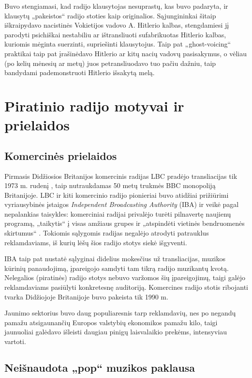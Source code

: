 \documentclass[kursinis-darbas]{vukf}
\begin{document}
Buvo stengiamasi, kad radijo klausytojas nesuprastų, kas buvo padaryta, ir klausytų „pakeistos“ radijo stoties kaip originalios. Sąjungininkai šitaip iškraipydavo nacistinės Vokietijos vadovo A. Hitlerio kalbas, stengdamiesi jį parodyti psichiškai nestabiliu ar ištransliuoti sufabrikuotas Hitlerio kalbas, kuriomis mėginta suerzinti, supriešinti klausytojus. Taip pat „ghost-voicing“ praktikai taip pat įrašinėdavo Hitlerio ar kitų nacių vadovų pasisakymus, o vėliau (po kelių mėnesių ar metų) juos petransliuodavo tuo pačiu dažniu, taip bandydami pademonstruoti Hitlerio išsakytą melą.


\section{Piratinio radijo motyvai ir prielaidos}

\subsection{Komercinės prielaidos}

Pirmasis Didžiosios Britanijos komercinis radijas LBC pradėjo transliacijas tik 1973 m. rudenį \cite{bbc_first_commercial_radio}, taip nutraukdamas 50 metų trukmės \gls{BBC} monopoliją Britanijoje. LBC ir kiti komercinio radijo pionieriai buvo atidžiai prižiūrimi vyriausybinės įstaigos \emph{Independent Broadcasting Authority} (IBA) ir veikė pagal nepalankias taisykles: komerciniai radijai privalėjo turėti pilnavertę naujienų programą, „taikytis“ į visas amžiaus grupes ir „atspindėti vietinės bendruomenės skirtumus“ \cite[p.~13]{cf_the_radio_handbook}. Tokiomis sąlygomis radijas negalėjo atrodyti patrauklus reklamdaviams, iš kurių lėšų šios radijo stotys siekė išgyventi.

IBA taip pat nustatė sąlyginai didelius mokesčius už transliacijas, muzikos kūrinių panaudojimą, įpareigojo samdyti tam tikrą radijo muzikantų kvotą. Nelegalios (piratinės) radijo stotys nebuvo varžomos šių įpareigojimų, taigi galėjo reklamdaviams pasiūlyti konkretesnę auditoriją. Komercines radijo stotis ribojanti tvarka Didžiojoje Britanijoje buvo pakeista tik 1990 m.

Jaunimo sektorius buvo daug populiaresnis tarp reklamdavių, nes po negandų pamažu atsigaunančių Europos valstybių ekonomikos pamažu kilo, taigi jaunuoliai galėdavo išleisti daugiau pinigų laisvalaikio prekėms, intensyviau vartoti.


\subsection{Neišnaudota „pop“ muzikos paklausa}
\end{document}
